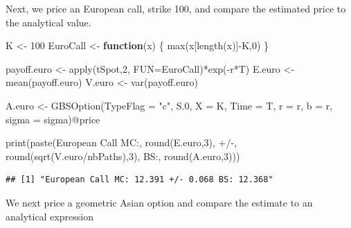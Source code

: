 \documentclass[12pt,]{tufte-book}
\newenvironment{Shaded}{}{}
\newcommand{\AttributeTok}[1]{\textcolor[rgb]{0.49,0.56,0.16}{#1}}
\newcommand{\ControlFlowTok}[1]{\textcolor[rgb]{0.00,0.44,0.13}{\textbf{#1}}}
\newcommand{\DecValTok}[1]{\textcolor[rgb]{0.25,0.63,0.44}{#1}}
\newcommand{\FloatTok}[1]{\textcolor[rgb]{0.25,0.63,0.44}{#1}}
\newcommand{\FunctionTok}[1]{\textcolor[rgb]{0.02,0.16,0.49}{#1}}
\newcommand{\NormalTok}[1]{#1}
\newcommand{\OtherTok}[1]{\textcolor[rgb]{0.00,0.44,0.13}{#1}}
\newcommand{\SpecialCharTok}[1]{\textcolor[rgb]{0.25,0.44,0.63}{#1}}
\newcommand{\StringTok}[1]{\textcolor[rgb]{0.25,0.44,0.63}{#1}}
\begin{document}
Next, we price an European call, strike 100, and compare the estimated price to the analytical value.

\begin{Shaded}
\begin{Highlighting}[]
\NormalTok{K }\OtherTok{\textless{}{-}} \DecValTok{100}
\NormalTok{EuroCall }\OtherTok{\textless{}{-}} \ControlFlowTok{function}\NormalTok{(x) \{}
  \FunctionTok{max}\NormalTok{(x[}\FunctionTok{length}\NormalTok{(x)]}\SpecialCharTok{{-}}\NormalTok{K,}\DecValTok{0}\NormalTok{)}
\NormalTok{\}}

\NormalTok{payoff.euro }\OtherTok{\textless{}{-}} \FunctionTok{apply}\NormalTok{(tSpot,}\DecValTok{2}\NormalTok{, }\AttributeTok{FUN=}\NormalTok{EuroCall)}\SpecialCharTok{*}\FunctionTok{exp}\NormalTok{(}\SpecialCharTok{{-}}\NormalTok{r}\SpecialCharTok{*}\NormalTok{T)}
\NormalTok{E.euro }\OtherTok{\textless{}{-}} \FunctionTok{mean}\NormalTok{(payoff.euro)}
\NormalTok{V.euro }\OtherTok{\textless{}{-}} \FunctionTok{var}\NormalTok{(payoff.euro)}

\NormalTok{A.euro }\OtherTok{\textless{}{-}} \FunctionTok{GBSOption}\NormalTok{(}\AttributeTok{TypeFlag =} \StringTok{"c"}\NormalTok{, S}\FloatTok{.0}\NormalTok{, }\AttributeTok{X =}\NormalTok{ K, }\AttributeTok{Time =}\NormalTok{ T, }\AttributeTok{r =}\NormalTok{ r, }
          \AttributeTok{b =}\NormalTok{ r, }\AttributeTok{sigma =}\NormalTok{ sigma)}\SpecialCharTok{@}\NormalTok{price}

\FunctionTok{print}\NormalTok{(}\FunctionTok{paste}\NormalTok{(}\StringTok{\textquotesingle{}European Call MC:\textquotesingle{}}\NormalTok{, }\FunctionTok{round}\NormalTok{(E.euro,}\DecValTok{3}\NormalTok{), }\StringTok{\textquotesingle{}+/{-}\textquotesingle{}}\NormalTok{,}
            \FunctionTok{round}\NormalTok{(}\FunctionTok{sqrt}\NormalTok{(V.euro}\SpecialCharTok{/}\NormalTok{nbPaths),}\DecValTok{3}\NormalTok{), }
            \StringTok{\textquotesingle{}BS:\textquotesingle{}}\NormalTok{, }\FunctionTok{round}\NormalTok{(A.euro,}\DecValTok{3}\NormalTok{)))}
\end{Highlighting}
\end{Shaded}

\begin{verbatim}
## [1] "European Call MC: 12.391 +/- 0.068 BS: 12.368"
\end{verbatim}

We next price a geometric Asian option and compare the estimate to an analytical expression
\end{document}
